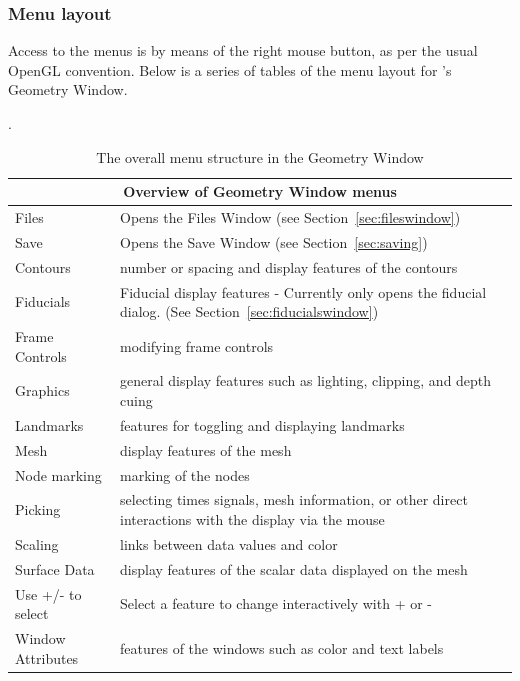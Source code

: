 \subsubsection{Menu layout}
\label{sec:control-menus}

Access to the menus is by means of the right mouse button, as per the usual
OpenGL convention.  Below is a series of tables of the menu layout for
\map{}'s Geometry Window.

\begin{table}[ht]
\caption{\label{table:menu-geom}
  The overall menu structure in the Geometry Window}.
  \begin{center}
    \begin{tabular}{|l|p{4in}|} \hline
      \multicolumn{2}{|c|}{\textbf{Overview of Geometry Window menus}} \\
      \hline \hline 
      Files & Opens the Files Window (see Section~\ref{sec:fileswindow}) \\
      Save & Opens the Save Window (see Section~\ref{sec:saving})  \\
      Contours & number or spacing and display features of the contours \\
      Fiducials & Fiducial display features - Currently only opens the fiducial
        dialog.  (See Section~\ref{sec:fiducialswindow})\\
      Frame Controls & modifying frame controls\\
      Graphics & general display features such as lighting, clipping,
        and depth cuing \\
      Landmarks & features for toggling and displaying landmarks \\ 
      Mesh & display features of the mesh \\
      Node marking & marking of the nodes \\
      Picking & selecting times signals, mesh information, or other direct
      interactions with the display via the mouse\\
      Scaling & links between data values and color\\
      Surface Data & display features of the scalar data displayed on the
      mesh \\  
      Use +/- to select & Select a feature to change interactively with + or -
      \\
      Window Attributes & features of the windows such as color and text
      labels \\ \hline
    \end{tabular}
  \end{center}
\end{table}


